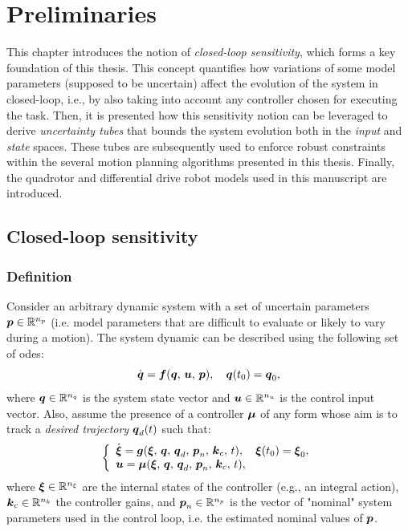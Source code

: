 \chapter{Preliminaries}\label{chap:models}

This chapter introduces the notion of \emph{closed-loop sensitivity}, which forms a key foundation of this thesis.
This concept quantifies how variations of some model parameters (supposed to be uncertain) affect the evolution of the system in closed-loop, i.e., by also taking into account any controller chosen for executing the task.
Then, it is presented how this sensitivity notion can be leveraged to derive \emph{uncertainty tubes} that bounds the system evolution both in the \emph{input} and \emph{state} spaces.
These tubes are subsequently used to enforce robust constraints within the several motion planning algorithms presented in this thesis.
Finally, the quadrotor and differential drive robot models used in this manuscript are introduced.

\section{Closed-loop sensitivity}\label{sec:sensi_and_tubes}

\subsection{Definition}\label{sec:sensi}

Consider an arbitrary dynamic system with a set of uncertain parameters $\boldsymbol{p} \in \mathbb{R}^{n_p}$ (i.e. model parameters that are difficult to evaluate or likely to vary during a motion).
The system dynamic can be described using the following set of \gls{odes}:
\begin{equation}\label{eq:dyna}
    \dot{\boldsymbol{q}}=\boldsymbol{f}(\boldsymbol{q},\,\boldsymbol{u},\,\boldsymbol{p}), \quad \boldsymbol{q}(t_0)=\boldsymbol{q}_{0},
\end{equation}
where $\boldsymbol{q}\in \mathbb{R}^{n_{q}}$ is the system state vector and $\boldsymbol{u}\in \mathbb{R}^{n_{u}}$ is the control input vector.
Also, assume the presence of a controller $\boldsymbol{\mu}$ of any form whose aim is to track a \emph{desired trajectory} $\boldsymbol{q}_d(t)$ such that:
\begin{equation}\label{eq:ctrl}
     \left \{
     \begin{array}{l l}
          \dot{\boldsymbol{\xi}} = \boldsymbol{g}(\boldsymbol{\xi},\,\boldsymbol{q},\,\boldsymbol{q}_d,\,\boldsymbol{p}_n,\,\boldsymbol{k}_c,\,t), \quad \boldsymbol{\xi}(t_0)=\boldsymbol{\xi}_{0}, \\
          \boldsymbol{u}=\boldsymbol{\mu}(\boldsymbol{\xi},\,\boldsymbol{q},\,\boldsymbol{q}_d,\,\boldsymbol{p}_n,\,\boldsymbol{k}_c,\,t), 
   \end{array} 
   \right .
\end{equation}
where $\boldsymbol{\xi}\in \mathbb{R}^{n_{\xi}}$ are the internal states of the controller (e.g., an integral action), $\boldsymbol{k}_{c}\in \mathbb{R}^{n_{k}}$ the controller gains, and $\boldsymbol{p}_{n}\in{\mathbb{R}^{n_{p}}}$ is the vector of "nominal" system parameters used in the control loop, i.e. the estimated nominal values of $\boldsymbol{p}$.

